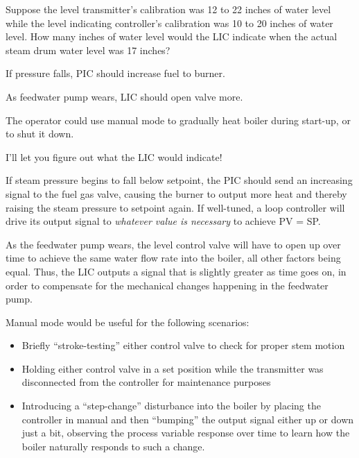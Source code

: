 Suppose the level transmitter's calibration was 12 to 22 inches of water level while the level indicating controller's calibration was 10 to 20 inches of water level.  How many inches of water level would the LIC indicate when the actual steam drum water level was 17 inches?  







If pressure falls, PIC should increase fuel to burner.

\vskip 10pt

As feedwater pump wears, LIC should open valve more.

\vskip 10pt

The operator could use manual mode to gradually heat boiler during start-up, or to shut it down.

\vskip 10pt

I'll let you figure out what the LIC would indicate!







If steam pressure begins to fall below setpoint, the PIC should send an increasing signal to the fuel gas valve, causing the burner to output more heat and thereby raising the steam pressure to setpoint again.  If well-tuned, a loop controller will drive its output signal to {\it whatever value is necessary} to achieve PV = SP.

\vskip 10pt

As the feedwater pump wears, the level control valve will have to open up over time to achieve the same water flow rate into the boiler, all other factors being equal.  Thus, the LIC outputs a signal that is slightly greater as time goes on, in order to compensate for the mechanical changes happening in the feedwater pump.

\vskip 10pt

Manual mode would be useful for the following scenarios:

\begin{itemize}
\item{} Briefly ``stroke-testing'' either control valve to check for proper stem motion
\item{} Holding either control valve in a set position while the transmitter was disconnected from the controller for maintenance purposes
\item{} Introducing a ``step-change'' disturbance into the boiler by placing the controller in manual and then ``bumping'' the output signal either up or down just a bit, observing the process variable response over time to learn how the boiler naturally responds to such a change.
\end{itemize}

